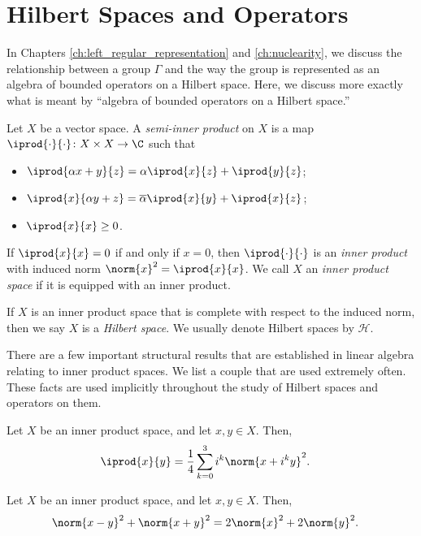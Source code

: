 \section{Hilbert Spaces and Operators}%
In Chapters \ref{ch:left_regular_representation} and \ref{ch:nuclearity}, we discuss the relationship between a group $\Gamma$ and the way the group is represented as an algebra of bounded operators on a Hilbert space. Here, we discuss more exactly what is meant by ``algebra of bounded operators on a Hilbert space.''
\begin{definition}
  Let $X$ be a vector space. A \textit{semi-inner product} on $X$ is a map $ \iprod{\cdot}{\cdot}\colon X\times X \rightarrow \C $ such that
  \begin{itemize}
    \item $ \iprod{\alpha x + y}{z} = \alpha \iprod{x}{z} + \iprod{y}{z}$;
    \item $ \iprod{x}{\alpha y + z} = \overline{\alpha}\iprod{x}{y} + \iprod{x}{z}$;
    \item $ \iprod{x}{x}\geq 0 $.
  \end{itemize}
  If $ \iprod{x}{x} = 0 $ if and only if $ x = 0 $, then $ \iprod{\cdot}{\cdot} $ is an \textit{inner product} with induced norm $\norm{x}^2 = \iprod{x}{x}$. We call $X$ an \textit{inner product space} if it is equipped with an inner product.\newline

  If $X$ is an inner product space that is complete with respect to the induced norm, then we say $X$ is a \textit{Hilbert space}. We usually denote Hilbert spaces by $ \mathcal{H} $.
\end{definition}
There are a few important structural results that are established in linear algebra relating to inner product spaces. We list a couple that are used extremely often. These facts are used implicitly throughout the study of Hilbert spaces and operators on them.
\begin{theorem}\label{thm:polarization}
  Let $X$ be an inner product space, and let $x,y\in X$. Then,
  \begin{align*}
    \iprod{x}{y} &= \frac{1}{4}\sum_{k=0}^{3} i^k\norm{x + i^ky}^2.
  \end{align*}
\end{theorem}
\begin{theorem}
  Let $X$ be an inner product space, and let $x,y\in X$. Then,
  \begin{align*}
    \norm{x-y}^2 + \norm{x+y}^2 &= 2\norm{x}^2 + 2\norm{y}^2.
  \end{align*}
\end{theorem}

